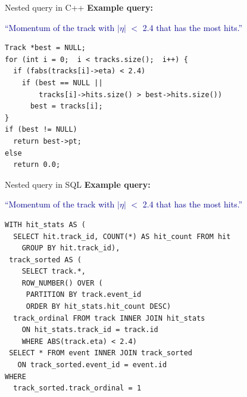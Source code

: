 \documentclass{beamer}
\begin{document}
\begin{frame}[fragile]{Nested query in C++}
\vspace{0.5 cm}
{\bf Example query:}
\begin{center}
\begin{minipage}{0.95\linewidth}
\textcolor{darkblue}{``Momentum of the track with $|\eta|$ $<$ 2.4 that has the most hits.''}
\end{minipage}
\end{center}
\small
\begin{verbatim}
Track *best = NULL;
for (int i = 0;  i < tracks.size();  i++) {
  if (fabs(tracks[i]->eta) < 2.4)
    if (best == NULL ||
        tracks[i]->hits.size() > best->hits.size())
      best = tracks[i];
}
if (best != NULL)
  return best->pt;
else
  return 0.0;
\end{verbatim}
\end{frame}

\begin{frame}[fragile]{Nested query in SQL}
\vspace{0.5 cm}
{\bf Example query:}
\begin{center}
\begin{minipage}{0.95\linewidth}
\textcolor{darkblue}{``Momentum of the track with $|\eta|$ $<$ 2.4 that has the most hits.''}
\end{minipage}
\end{center}
\small
\begin{verbatim}
WITH hit_stats AS (
  SELECT hit.track_id, COUNT(*) AS hit_count FROM hit
    GROUP BY hit.track_id),
 track_sorted AS (
    SELECT track.*, 
    ROW_NUMBER() OVER (
     PARTITION BY track.event_id
     ORDER BY hit_stats.hit_count DESC)
  track_ordinal FROM track INNER JOIN hit_stats
    ON hit_stats.track_id = track.id
    WHERE ABS(track.eta) < 2.4)
 SELECT * FROM event INNER JOIN track_sorted
   ON track_sorted.event_id = event.id
WHERE
  track_sorted.track_ordinal = 1
\end{verbatim}
\end{frame}
\end{document}
